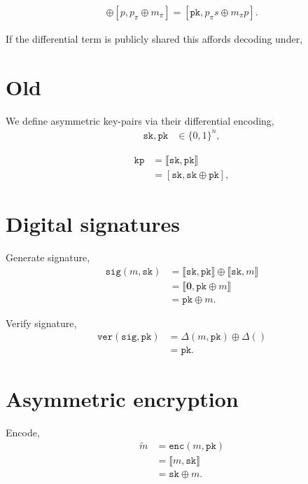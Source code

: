\documentclass[twocolumn, aps, amsmath, amssymb, nofootinbib, superscriptaddress, longbibliography, doublefloatfix, table-of-contents, eqsecnum, rmp]{revtex4-2}
\def\sk{\mathtt{sk}}
\def\pk{\mathtt{pk}}
\def\kp{\mathtt{kp}}
\def\sig{\mathtt{sig}}
\def\ver{\mathtt{ver}}
\def\enc{\mathtt{enc}}
\def\diff#1#2{\llbracket #1,#2\rrbracket}
\begin{document}
\begin{align}
	[s,s \oplus p] \oplus [p,p_\pi \oplus m_\pi] = [\mathtt{pk}, p_\pi s \oplus m_\pi p].
\end{align}

If the differential term is publicly shared this affords decoding under,

\section{Old}

We define asymmetric key-pairs via their differential encoding,
\begin{align}
	\mathtt{sk}, \mathtt{pk} &\in \{0,1\}^n,
\end{align}

\begin{align}
	\kp &= \diff{\sk}{\pk} \nonumber\\
	&= [\sk,\sk \oplus \pk],
\end{align}

\section{Digital signatures}

Generate signature,
\begin{align}
	\sig(m,\sk) &= \diff{\sk}{\pk} \oplus \diff{\sk}{m} \nonumber\\
	&= \diff{\mathbf{0}}{\pk\oplus m} \nonumber\\
	&= \pk \oplus m.
\end{align}

Verify signature,
\begin{align}
	\ver(\sig,\pk) &= \Delta(m,\pk) \oplus \Delta() \nonumber\\
	&= \pk.
\end{align}

\section{Asymmetric encryption}

Encode,
\begin{align}
	\tilde{m} &= \enc(m,\pk) \nonumber\\
	&= \diff{m}{\sk} \nonumber\\
	&= \sk \oplus m.
\end{align}
\end{document}

